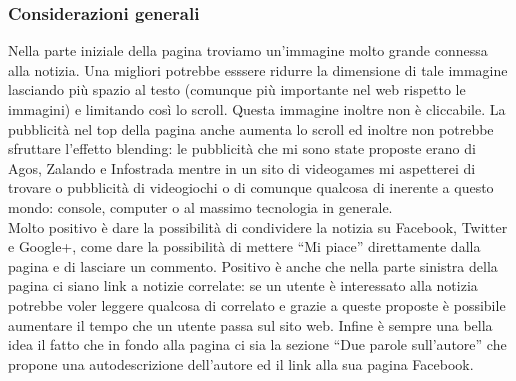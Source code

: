 \documentclass[../ProgettoTecWeb2.tex]{subfiles}
\begin{document}
		\subsubsection{Considerazioni generali}
		Nella parte iniziale della pagina troviamo un'immagine molto grande connessa alla notizia. Una migliori potrebbe esssere ridurre la dimensione di tale immagine lasciando più spazio al testo (comunque più importante nel web rispetto le immagini) e limitando così lo scroll. Questa immagine inoltre non è cliccabile. La pubblicità nel top della pagina anche aumenta lo scroll ed inoltre non potrebbe sfruttare l'effetto blending: le pubblicità che mi sono state proposte erano di Agos, Zalando e Infostrada mentre in un sito di videogames mi aspetterei di trovare o pubblicità di videogiochi o di comunque qualcosa di inerente a questo mondo: console, computer o al massimo tecnologia in generale. \\

		Molto positivo è dare la possibilità di condividere la notizia su Facebook, Twitter e Google+, come dare la possibilità di mettere ``Mi piace'' direttamente dalla pagina e di lasciare un commento. Positivo è anche che nella parte sinistra della pagina ci siano link a notizie correlate: se un utente è interessato alla notizia potrebbe voler leggere qualcosa di correlato e grazie a queste proposte è possibile aumentare il tempo che un utente passa sul sito web. Infine è sempre una bella idea il fatto che in fondo alla pagina ci sia la sezione ``Due parole sull'autore'' che propone una autodescrizione dell'autore ed il link alla sua pagina Facebook.

	\newpage
\end{document}

